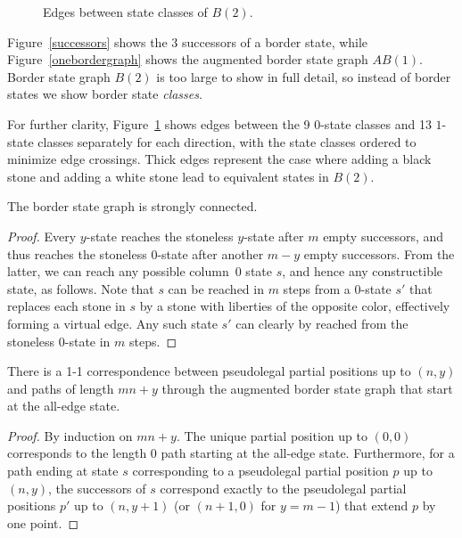 \documentclass{article}
\begin{document}
\begin{figure}
\begin{center}
\epsfxsize=12cm 
\end{center}
\caption{Edges between state classes of $B(2)$.}
\label{twobordergraph}
\end{figure}

Figure~\ref{successors} shows the 3 successors of a border state,
while Figure~\ref{onebordergraph} shows
the augmented border state graph $AB(1)$.
Border state graph $B(2)$ is too large to show in full detail,
so instead of border states we show border state {\em classes}.

For further clarity, Figure~\ref{twobordergraph} 
shows edges between the 9 $0$-state classes and 13 $1$-state classes
separately for each direction,
with the state classes ordered to minimize edge crossings.
Thick edges represent the case where adding a black stone
and adding a white stone lead to equivalent states in $B(2)$.

\begin{lemma}
\label{connected-border-graph}
  The border state graph is strongly connected.
\end{lemma}

\begin{proof}
Every $y$-state reaches the stoneless $y$-state after $m$ empty
successors, and thus reaches the stoneless $0$-state after another
$m-y$ empty successors.
From the latter, we can reach any possible column~0 state $s$,
and hence any constructible state, as follows. Note that $s$ can be reached
in $m$ steps from a $0$-state $s'$ that replaces each stone in $s$ by
a stone with liberties of the opposite color, effectively forming
a virtual edge. Any such state $s'$ can clearly by reached from
the stoneless $0$-state in $m$ steps.
\end{proof}

\begin{lemma}
\label{positionpaths}
There is a 1-1 correspondence between pseudolegal partial positions up
to $(n,y)$ and paths of length $mn+y$ through the augmented border state
graph that start at the all-edge state.
\end{lemma}

\begin{proof}
By induction on $mn+y$. The unique partial position up to $(0,0)$
corresponds to the length $0$ path starting at the all-edge state.
Furthermore, for a path ending at state $s$ corresponding to a
pseudolegal partial position $p$ up to $(n,y)$, the successors of $s$
correspond exactly to the pseudolegal partial positions $p'$ up to
$(n,y+1)$ (or $(n+1,0)$ for $y=m-1$) that extend $p$ by one point.
\end{proof}
\end{document}
